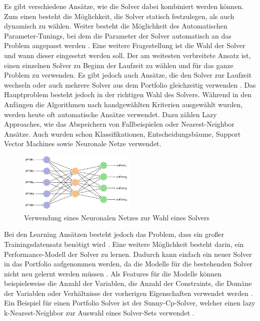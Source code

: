 Es gibt verschiedene Ansätze, wie die Solver dabei kombiniert werden können. Zum
einen besteht die Möglichkeit, die Solver statisch festzulegen, als auch
dynamisch zu wählen. Weiter besteht die Möglichkeit des Automatischen
Parameter-Tunings, bei dem die Parameter der Solver automatisch an das Problem
angepasst werden \cite[8-11]{kotth12jo}. Eine weitere Fragestellung ist die Wahl
der Solver und wann dieser eingesetzt werden soll. Der am weitesten verbreitete
Ansatz ist, einen einzelnen Solver zu Beginn der Laufzeit zu wählen und für das
ganze Problem zu verwenden. Es gibt jedoch auch Ansätze, die den Solver zur
Laufzeit wechseln oder auch mehrere Solver aus dem Portfolio gleichzeitig
verwenden \cite[11-14]{kotth12jo}. Das Hauptproblem besteht jedoch in der
richtigen Wahl des Solvers. Während in den Anfängen die Algorithmen nach
handgewählten Kriterien ausgewählt wurden, werden heute oft automatische Ansätze
verwendet. Dazu zählen Lazy Approaches, wie das Abspeichern von Fallbeispielen
oder Nearest-Neighbor Ansätze. Auch wurden schon Klassifikationen,
Entscheidungsbäume, Support Vector Machines sowie Neuronale Netze verwendet.

\begin{figure}[h]
    \centering
    \includegraphics[width=0.5\textwidth]{figures/Neuronal Nework to choose Solver [popes22jo].PNG}
    \caption{Verwendung eines Neuronalen Netzes zur Wahl eines Solvers
    \cite[105]{popes22jo}}
    \label{fig:bild}
\end{figure}

Bei den Learning Ansätzen besteht jedoch das Problem, dass ein großer
Trainingsdatensatz benötigt wird \cite[15-16]{kotth12jo}. Eine weitere
Möglichkeit besteht darin, ein Performance-Modell der Solver zu lernen. Dadurch
kann einfach ein neuer Solver in das Portfolio aufgenommen werden, da die
Modelle für die bestehenden Solver nicht neu gelernt werden müssen
\cite[18]{kotth12jo}. Als Features für die Modelle können beispielsweise die
Anzahl der Variablen, die Anzahl der Constraints, die Domäne der Variablen oder
Verhältnisse der vorherigen Eigenschaften verwendet werden \cite[22]{kotth12jo}.
Ein Beispiel für einen Portfolio Solver ist der Sunny-Cp-Solver, welcher einen
lazy k-Nearest-Neighbor zur Auswahl eines Solver-Sets verwendet
\cite[4]{amadi15jo}.


